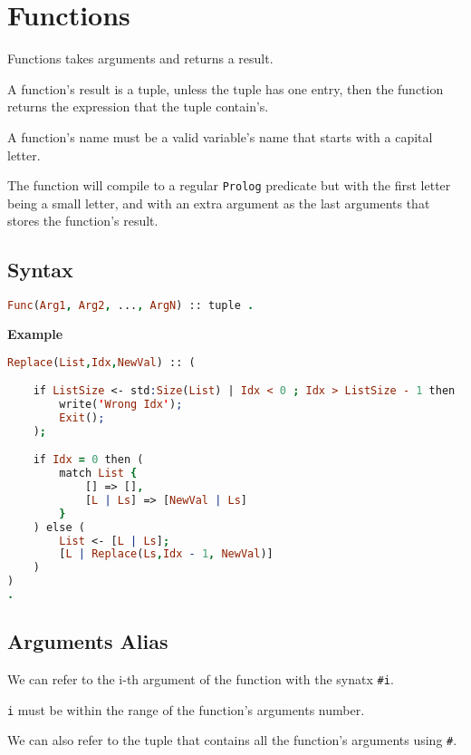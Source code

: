 \section{Functions}


Functions takes arguments and returns a result.

A function's result is a tuple, unless the tuple has one entry, then
the function returns the expression that the tuple contain's.

A function's name must be a valid variable's name that starts with a capital
letter. 

The function will compile to a regular \texttt{Prolog} predicate but
with the first letter being a small letter, and with an extra
argument as the last arguments that stores the function's result.

\subsection{Syntax}

\begin{lstlisting}[language = Prolog]
Func(Arg1, Arg2, ..., ArgN) :: tuple .
\end{lstlisting}


\noindent \textbf{Example}

\begin{lstlisting}[language = Prolog]
Replace(List,Idx,NewVal) :: (

    if ListSize <- std:Size(List) | Idx < 0 ; Idx > ListSize - 1 then (
        write('Wrong Idx');
        Exit();
    );

    if Idx = 0 then (
        match List {
            [] => [],
            [L | Ls] => [NewVal | Ls]
        }
    ) else (
        List <- [L | Ls]; 
        [L | Replace(Ls,Idx - 1, NewVal)]
    )
)
.
\end{lstlisting}



\subsection{Arguments Alias}

We can refer to the i-th argument of the function with
the synatx \texttt{#i}.

\texttt{i} must be within the range of the function's arguments number.

We can also refer to the tuple that contains all the function's 
arguments using \texttt{#}.

